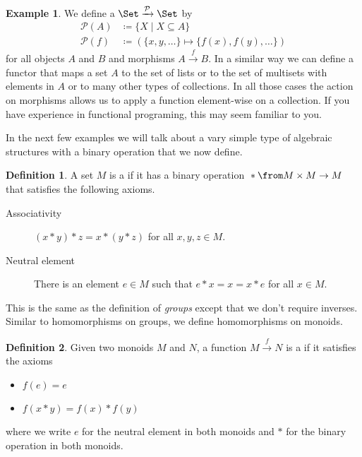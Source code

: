 \documentclass{article}
\theoremstyle{definition}
\newtheorem{definition}{Definition}
\newtheorem{example}{Example}
\begin{document}
\begin{example}
  We define a  $\Set \xrightarrow{\mathcal{P}} \Set$ by
  \begin{align*}
    \mathcal{P}(A) &\coloneqq \{ X \mid X \subseteq A \} \\
    \mathcal{P}(f) &\coloneqq (\{x, y, \ldots\} \mapsto \{f(x), f(y), \ldots\})
  \end{align*}
  for all objects $A$ and $B$ and morphisms $A \xrightarrow{f} B$.
  In a similar way we can define a functor that maps a set $A$ to the set of lists or to the set of multisets with elements in $A$ or to many other types of collections.
  In all those cases the action on morphisms allows us to apply a function element-wise on a collection.
  If you have experience in functional programing, this may seem familiar to you.
\end{example}

In the next few examples we will talk about a vary simple type of algebraic structures with a binary operation that we now define.

\begin{definition}
  A set $M$ is a  if it has a binary operation ${}*{} \from M \times M \to M$ that satisfies the following axioms.
  \begin{description}
    \item [Associativity] $(x * y) * z = x * (y * z)$ for all $x, y, z \in M$.
    \item [Neutral element] There is an element $e \in M$ such that $e * x = x = x * e$ for all $x \in M$.
  \end{description}
\end{definition}

This is the same as the definition of \emph{groups} except that we don't require inverses.
Similar to homomorphisms on groups, we define homomorphisms on monoids.

\begin{definition}
  Given two monoids $M$ and $N$, a function $M \xrightarrow{f} N$ is a  if it satisfies the axioms
  \begin{itemize}
    \item $f(e) = e$
    \item $f(x * y) = f(x) * f(y)$
  \end{itemize}
  where we write $e$ for the neutral element in both monoids and $*$ for the binary operation in both monoids.
\end{definition}
\end{document}
